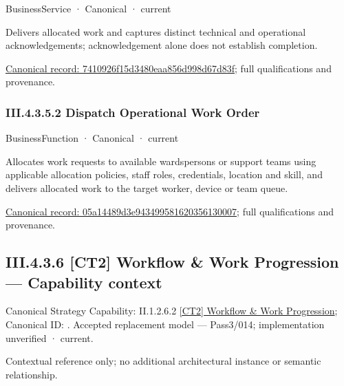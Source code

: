 \label{element:7410926f15d3480eaa856d998d67d83f}
{\small BusinessService · Canonical · current}\par

Delivers allocated work and captures distinct technical and operational acknowledgements; acknowledgement alone does not establish completion.


{\footnotesize \href{../../../../../../../../continuum/business/business-service/7410926f15d3480eaa856d998d67d83f.md}{Canonical record: 7410926f15d3480eaa856d998d67d83f}; full qualifications and provenance.}\par
\subsubsection*{III.4.3.5.2 Dispatch Operational Work Order}
\label{navigation:III.4.3.5.2}

\label{element:05a14489d3e943499581620356130007}
{\small BusinessFunction · Canonical · current}\par

Allocates work requests to available wardspersons or support teams using applicable allocation policies, staff roles, credentials, location and skill, and delivers allocated work to the target worker, device or team queue.


{\footnotesize \href{../../../../../../../../continuum/business/business-function/05a14489d3e943499581620356130007.md}{Canonical record: 05a14489d3e943499581620356130007}; full qualifications and provenance.}\par
\subsection*{III.4.3.6 [CT2] Workflow \& Work Progression — Capability context}
\label{navigation:III.4.3.6}

{\small Canonical Strategy Capability: II.1.2.6.2 \hyperref[element:2813ee6e848a467ab77fc34108807c26]{[CT2] Workflow \& Work Progression}; Canonical ID: \texttt{}. Accepted replacement model — Pass3/014; implementation unverified · current.}\par
Contextual reference only; no additional architectural instance or semantic relationship.\par
